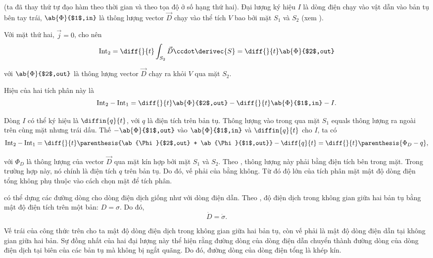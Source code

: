 \noindent
(ta đã thay thứ tự đạo hàm theo thời gian và theo tọa độ ở số hạng thứ hai).
Đại lượng ký hiệu $I$ là dòng điện chạy vào vật dẫn vào bản tụ bên tay trái,  $\ab{\Phi}{$1$,in}$ là thông lượng vector $\vec{D}$ chạy vào thể tích $V$ bao bởi mặt $S_1$ và $S_2$ (xem ).

Với mặt thứ hai, $\vec{j}=0$, cho nên
\begin{equation*}
    \text{Int}_2 = \diff{}{t} \int_{S_2} \vec{D} \ccdot \derivec{S} = \diff{}{t} \ab{\Phi}{$2$,out}
\end{equation*}

\noindent
với $\ab{\Phi}{$2$,out}$ là thông lượng vector  $\vec{D}$ chạy ra khỏi $V$ qua mặt $S_2$.

Hiệu của hai tích phân này là
\begin{equation*}
    \text{Int}_2 - \text{Int}_1 = \diff{}{t} \ab{\Phi}{$2$,out} - \diff{}{t} \ab{\Phi}{$1$,in} - I.
\end{equation*}

\noindent
Dòng $I$ có thể ký hiệu là $\diffin{q}{t}$, với $q$ là điện tích trên bản tụ.
Thông lượng vào trong qua mặt $S_1$ equals
thông lượng ra ngoài trên cùng mặt nhưng trái dấu.
Thế $-\ab{\Phi}{$1$,out}$ vào $\ab{\Phi}{$1$,in}$ và $\diffin{q}{t}$ cho $I$, ta có
\begin{equation}\label{eq:9_14}
    \text{Int}_2 - \text{Int}_1 = \diff{}{t} \parenthesis{\ab{\Phi}{$2$,out} + \ab{\Phi}{$1$,out}} - \diff{q}{t} = \diff{}{t} \parenthesis{\Phi_D - q},
\end{equation}

\noindent
với $\Phi_D$ là thông lượng của vector $\vec{D}$ qua mặt kín hợp bởi mặt $S_1$ và $S_2$.
Theo , thông lượng này phải bằng điện tích bên trong mặt.
Trong trường hợp này, nó chính là điện tích $q$ trên bản tụ.
Do đó, vế phải của  bằng không.
Từ đó độ lớn của tích phân mặt mật độ dòng điện tổng không phụ thuộc vào cách chọn mặt để tích phân.

có thể dựng các đường dòng cho dòng điện dịch giống như với dòng điện dẫn.
Theo , độ điện dịch trong không gian giữa hai bản tụ bằng mật độ điện tích trên một bản: $D=\sigma$.
Do đó,
\begin{equation*}
    \dot{D} = \dot{\sigma}.
\end{equation*}

\noindent
Vế trái của công thức trên cho ta mật độ dòng điện dịch trong không gian giữa hai bản tụ, còn vế phải là mật độ dòng điện dẫn tại không gian giữa hai bản.
Sự đồng nhất của hai đại lượng này thể hiện rằng đường dòng của dòng điện dẫn chuyển thành đường dòng của dòng điện dịch tại biên của các bản tụ mà không bị ngắt quãng.
Do đó, đường dòng của dòng điện tổng là khép kín.

